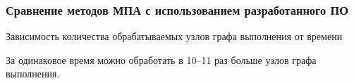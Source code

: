 \documentclass[10pt,gray]{beamer}
\begin{document}
\begin{frame}
\frametitle{Сравнение методов МПА с использованием разработанного ПО}
Зависимость количества обрабатываемых узлов графа выполнения от времени
\begin{figure}[h]
  \begin{minipage}[h]{0.49\linewidth}
  \end{minipage}
  \hfill
  \begin{minipage}[h]{0.49\linewidth}
  \end{minipage}
\end{figure}
  За одинаковое время можно обработать в 10--11 раз больше узлов графа выполнения.
\end{frame}
\end{document}
